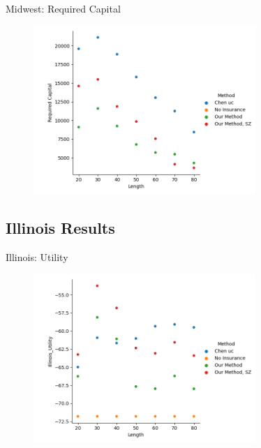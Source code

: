 \documentclass{beamer}
\begin{document}
\begin{frame}{Midwest: Required Capital}
    \begin{figure}
        \includegraphics[width=0.75\textwidth]{../../../output/figures/Midwest Evaluation/Midwest_Required Capital_Length.png}
    \end{figure}
\end{frame}

\subsection*{Illinois Results}
\begin{frame}{Illinois: Utility}
    \begin{figure}
        \includegraphics[width=0.75\textwidth]{../../../output/figures/Midwest Evaluation/Illinois_Utility_Length.png}
    \end{figure}
\end{frame}
\end{document}
